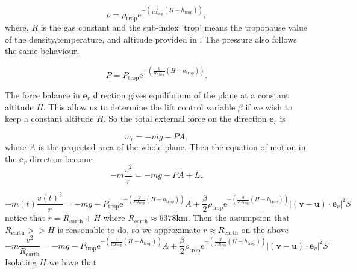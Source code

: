 \documentclass{article}
\renewcommand{\vec}[1]{\boldsymbol{#1}}
\begin{document}
\begin{equation}
    \rho= \rho_{\text{trop}}e^{-\left( \frac{g}{RT_{\text{trop}}}(H-h_{\text{trop}}) \right)},
\end{equation}
where, $R$ is the gas constant  and the sub-index 'trop' means the tropopause value of the density,temperature, and altitude provided in \cite{nuic2004bada}. The pressure also follows the same behaviour.

\begin{equation}
    P= P_{\text{trop}}\mathrm{e}^{-\left( \frac{g}{RT_{\text{trop}}}(H-h_{\text{trop}}) \right)}.
\end{equation}
 

The force balance in $\vec{e}_r$ direction gives equilibrium of the plane at a constant altitude $H$. This allow us to determine the lift control variable $\beta$ if we wish to keep a constant altitude $H$. So the total external force on the direction $\vec{e}_r$ is 

\begin{equation}
    w_r=-mg -PA ,
\end{equation}
where $A$ is the projected area of the whole plane. Then the equation of motion in the $\vec{e}_r$ direction become
\begin{equation}
    -m\frac{v^2}{r}=-mg- PA +L_r
\end{equation}

\begin{equation}
     -m(t)\frac{v(t)^2}{r}=-mg-  P_{\text{trop}}\mathrm{e}^{-\left( \frac{g}{RT_{\text{trop}}}(H-h_{\text{trop}}) \right)}A +\frac{\beta }{2} \rho_{\text{trop}}\mathrm{e}^{-\left( \frac{g}{RT_{\text{trop}}}(H-h_{\text{trop}}) \right)} |(\vec{v}-\vec{u})\cdot \vec e_v|^2S
   \end{equation}
notice that $r=R_{\text{earth}}+H$ where $R_{\text{earth}}\approx 6378\text{km}$. Then the assumption that $R_{\text{earth}}>> H$ is reasonable to do, so we approximate $r\approx R_{\text{earth}}$ on the above 
\begin{equation}
    -m\frac{v^2}{R_{\text{earth}}}= -mg-  P_{\text{trop}}\mathrm{e}^{-\left( \frac{g}{RT_{\text{trop}}}(H-h_{\text{trop}}) \right)}A +\frac{\beta }{2} \rho_{\text{trop}}\mathrm{e}^{-\left( \frac{g}{RT_{\text{trop}}}(H-h_{\text{trop}}) \right)} |(\vec{v}-\vec{u})\cdot \vec e_v|^2S
\end{equation}
Isolating $H$  we have that
\end{document}
